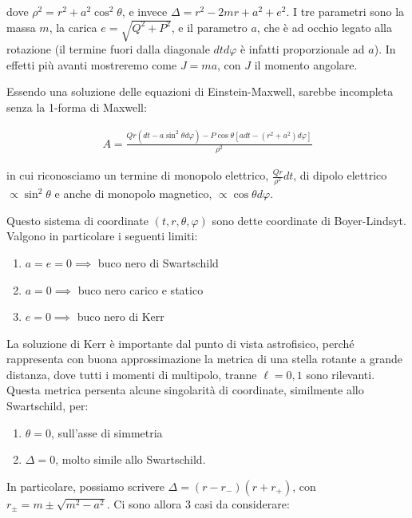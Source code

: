 \documentclass{report}
\begin{document}
dove \(\rho^2 = r^2 + a^2\cos^2\theta\), e invece \(\Delta = r^2 - 2mr + a^2 +e^2\). I tre parametri sono la massa \(m\), la carica \(e = \sqrt{Q^2 + P^2}\), e il parametro \(a\), che è ad occhio legato alla rotazione (il termine fuori dalla diagonale \(dtd\varphi\) è infatti proporzionale ad \(a\)). In effetti più avanti mostreremo come \(J = ma\), con \(J\) il momento angolare. 

Essendo una soluzione delle equazioni di Einstein-Maxwell, sarebbe incompleta senza la 1-forma di Maxwell: 

\begin{align}
    A = \frac{Qr(dt - a\sin^2\theta d\varphi) - P\cos\theta[adt - (r^2+a^2)d\varphi]}{\rho^2}
\end{align}

in cui riconosciamo un termine di monopolo elettrico, \(\frac{Qr}{\rho^2}dt\), di dipolo elettrico \(\propto \sin^2\theta\) e anche di monopolo magnetico, \(\propto \cos\theta d\varphi\). 

Questo sistema di coordinate \((t, r, \theta, \varphi)\) sono dette coordinate di Boyer-Lindsyt. Valgono in particolare i seguenti limiti: 

\begin{enumerate}
    \item \(a = e = 0 \implies\) buco nero di Swartschild
    \item \(a=0 \implies \) buco nero carico e statico
    \item \(e =0 \implies\) buco nero di Kerr
\end{enumerate}

La soluzione di Kerr è importante dal punto di vista astrofisico, perché rappresenta con buona approssimazione la metrica di una stella rotante a grande distanza, dove tutti i momenti di multipolo, tranne \(\ell = 0, 1\) sono rilevanti. Questa metrica persenta alcune singolarità di coordinate, similmente allo Swartschild, per: 

\begin{enumerate}
    \item \(\theta = 0\), sull'asse di simmetria 
    \item \(\Delta =0\), molto simile allo Swartschild. 
\end{enumerate}

In particolare, possiamo scrivere \(\Delta = (r-r_-)(r+r_+)\), con \(r_\pm = m \pm \sqrt{m^2 -a^2}\). Ci sono allora 3 casi da considerare: 
\end{document}

